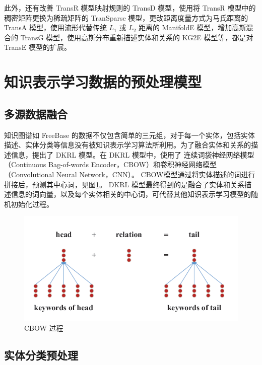 \documentclass{llncs}
\begin{document}
此外，还有改善 TransR 模型映射规则的 TransD 模型\cite{DBLP:conf/er/XiongHD18}，使用将 TransR 模型中的稠密矩阵更换为稀疏矩阵的 TranSparse 模型\cite{DBLP:conf/aaai/JiLH016}，更改距离度量方式为马氏距离的 TransA 模型\cite{DBLP:journals/corr/0005HHZ15a}，使用流形代替传统 $L_1$ 或 $L_2$ 距离的 ManifoldE 模型\cite{DBLP:conf/ijcai/0005HZ16}，增加高斯混合的 TransG 模型\cite{DBLP:journals/corr/0005HHZ15}，使用高斯分布重新描述实体和关系的 KG2E 模型\cite{DBLP:conf/cikm/HeLJ015}等，都是对 TransE 模型的扩展。

\section{知识表示学习数据的预处理模型}

\subsection{多源数据融合}

知识图谱如 FreeBase 的数据不仅包含简单的三元组，对于每一个实体，包括实体描述、实体分类等信息没有被知识表示学习算法所利用。为了融合实体和关系的描述信息，提出了 DKRL 模型\cite{DBLP:conf/aaai/XieLJLS16}。在 DKRL 模型中，使用了 连续词袋神经网络模型（Continuous Bag-of-words Encoder，CBOW）\cite{DBLP:journals/corr/abs-1301-3781}和卷积神经网络模型（Convolutional Neural Network，CNN）\cite{DBLP:conf/icml/CollobertW08}。 CBOW模型通过将实体描述的词进行拼接后，预测其中心词，见图\ref{fg:CBOW}。 DKRL 模型最终得到的是融合了实体和关系描述信息的词向量，以及每个实体相关的中心词，可代替其他知识表示学习模型的随机初始化过程。

\begin{figure}
	\centering
	\includegraphics[width=0.8\columnwidth]{figures/CBOW.png}
	\caption{ CBOW 过程}
	\label{fg:CBOW}
\end{figure}

\subsection{实体分类预处理}
\end{document}
